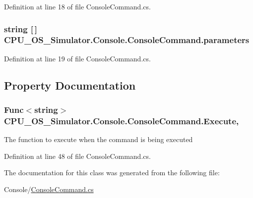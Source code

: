 Definition at line 18 of file Console\+Command.\+cs.

\hypertarget{class_c_p_u___o_s___simulator_1_1_console_1_1_console_command_a00586d96461c740fd20069c604424c22}{}
\subsubsection[{parameters}]{\setlength{\rightskip}{0pt plus 5cm}string \mbox{[}$\,$\mbox{]} C\+P\+U\+\_\+\+O\+S\+\_\+\+Simulator.\+Console.\+Console\+Command.\+parameters\hspace{0.3cm}{\ttfamily [private]}}\label{class_c_p_u___o_s___simulator_1_1_console_1_1_console_command_a00586d96461c740fd20069c604424c22}


Definition at line 19 of file Console\+Command.\+cs.



\subsection{Property Documentation}
\hypertarget{class_c_p_u___o_s___simulator_1_1_console_1_1_console_command_a9b4fd5675ec062a721c2e5e78022117b}{}
\subsubsection[{Execute}]{\setlength{\rightskip}{0pt plus 5cm}Func$<$string$>$ C\+P\+U\+\_\+\+O\+S\+\_\+\+Simulator.\+Console.\+Console\+Command.\+Execute\hspace{0.3cm}{\ttfamily [get]}, {\ttfamily [set]}}\label{class_c_p_u___o_s___simulator_1_1_console_1_1_console_command_a9b4fd5675ec062a721c2e5e78022117b}


The function to execute when the command is being executed 



Definition at line 48 of file Console\+Command.\+cs.



The documentation for this class was generated from the following file\+:\begin{DoxyCompactItemize}
\item 
Console/\hyperlink{_console_command_8cs}{Console\+Command.\+cs}\end{DoxyCompactItemize}
